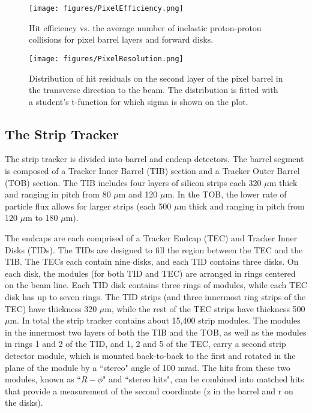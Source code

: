 \begin{figure}\centering
  \texttt{[image: figures/PixelEfficiency.png]}
  \caption{\label{fig:PixelEfficiency} Hit efficiency vs. the average number of inelastic proton-proton collisions for pixel barrel layers and forward disks.}
\end{figure}

\begin{figure}\centering
  \texttt{[image: figures/PixelResolution.png]}
  \caption{\label{fig:PixelResolution} Distribution of hit residuals on the second layer of the pixel barrel in the transverse direction to the beam. The distribution is fitted with a student's t-function for which sigma is shown on the plot.}
\end{figure}

\subsection{The Strip Tracker}

The strip tracker is divided into barrel and endcap detectors. The barrel segment is composed of a Tracker Inner Barrel (TIB) section and a Tracker Outer Barrel (TOB) section. The TIB includes four layers of silicon strips each 320 $\mu$m thick and ranging in pitch from 80 $\mu$m and 120 $\mu$m. In the TOB, the lower rate of particle flux allows for larger strips (each 500 $\mu$m thick and ranging in pitch from 120 $\mu$m to 180 $\mu$m).

The endcaps are each comprised of a Tracker Endcap (TEC) and Tracker Inner Disks (TIDs). The TIDs are designed to fill the region between the TEC and the TIB. The TECs each contain nine disks, and each TID contains three disks. On each disk, the modules (for both TID and TEC) are arranged in rings centered on the beam line. Each TID disk contains three rings of modules, while each TEC disk has up to seven rings. The TID strips (and three innermost ring strips of the TEC) have thickness 320 $\mu$m, while the rest of the TEC strips have thickness 500 $\mu$m. In total the strip tracker contains about 15,400 strip modules. The modules in the innermost two layers of both the TIB and the TOB, as well as the modules in rings 1 and 2 of the TID, and 1, 2 and 5 of the TEC, carry a second strip detector module, which
is mounted back-to-back to the first and rotated in the plane of the module by a ``stereo" angle
of 100 mrad. The hits from these two modules, known as ``$R-\phi$" and ``stereo hits", can be combined
into matched hits that provide a measurement of the second coordinate (z in the barrel and r on
the disks).\cite{TrackReco}\cite{TDR}



